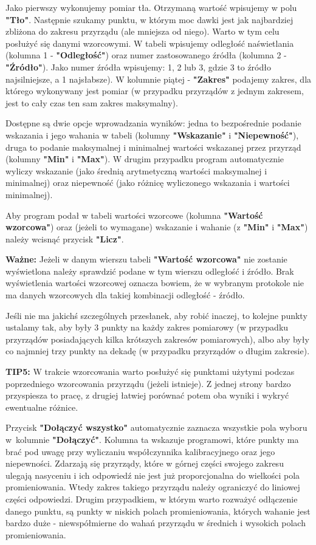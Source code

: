 Jako pierwszy wykonujemy pomiar tła. Otrzymaną wartość wpisujemy w polu \textbf{"Tło"}. Następnie szukamy punktu, w którym moc dawki jest jak najbardziej zbliżona do zakresu przyrządu (ale mniejsza od niego). Warto w tym celu posłużyć się danymi wzorcowymi. W tabeli wpisujemy odległość naświetlania (kolumna 1 - \textbf{"Odległość"}) oraz numer zastosowanego źródła (kolumna 2 - \textbf{"Źródło"}). Jako numer źródła wpisujemy: 1, 2 lub 3, gdzie 3 to źródło najsilniejsze, a 1 najsłabsze). W kolumnie piątej - \textbf{"Zakres"} podajemy zakres, dla którego wykonywany jest pomiar (w przypadku przyrządów z jednym zakresem, jest to cały czas ten sam zakres maksymalny).

Dostępne są dwie opcje wprowadzania wyników: jedna to bezpośrednie podanie wskazania i jego wahania w tabeli (kolumny \textbf{"Wskazanie"} i \textbf{"Niepewność"}), druga to podanie maksymalnej i minimalnej wartości wskazanej przez przyrząd (kolumny \textbf{"Min"} i \textbf{"Max"}). W drugim przypadku program automatycznie wyliczy wskazanie (jako średnią arytmetyczną wartości maksymalnej i minimalnej) oraz niepewność (jako różnicę wyliczonego wskazania i wartości minimalnej).

Aby program podał w tabeli wartości wzorcowe (kolumna \textbf{"Wartość wzorcowa"}) oraz (jeżeli to wymagane) wskazanie i wahanie (z \textbf{"Min"} i \textbf{"Max"}) należy wcisnąć przycisk \textbf{"Licz"}. 

\textbf{Ważne:} Jeżeli w danym wierszu tabeli \textbf{"Wartość wzorcowa"} nie zostanie wyświetlona należy sprawdzić podane w tym wierszu odległość i źródło. Brak wyświetlenia wartości wzorcowej oznacza bowiem, że w wybranym protokole nie ma danych wzorcowych dla takiej kombinacji odległość - źródło.

Jeśli nie ma jakichś szczególnych przesłanek, aby robić inaczej, to kolejne punkty ustalamy tak, aby były 3 punkty na każdy zakres pomiarowy (w przypadku przyrządów posiadających kilka krótszych zakresów pomiarowych), albo aby były co najmniej trzy punkty na dekadę (w przypadku przyrządów o długim zakresie).

\textbf{TIP5:} W trakcie wzorcowania warto posłużyć się punktami użytymi podczas poprzedniego wzorcowania przyrządu (jeżeli istnieje). Z jednej strony bardzo przyspiesza to pracę, z drugiej łatwiej porównać potem oba wyniki i wykryć ewentualne różnice.

Przycisk \textbf{"Dołączyć wszystko"} automatycznie zaznacza wszystkie pola wyboru w~kolumnie \textbf{"Dołączyć"}. Kolumna ta wskazuje programowi, które punkty ma brać pod uwagę przy wyliczaniu współczynnika kalibracyjnego oraz jego niepewności. Zdarzają się przyrządy, które w górnej części swojego zakresu ulegają nasyceniu i ich odpowiedź nie jest już proporcjonalna do wielkości pola promieniowania. Wtedy zakres takiego przyrządu należy ograniczyć do liniowej części odpowiedzi. Drugim przypadkiem, w którym warto rozważyć odłączenie danego punktu, są punkty w niskich polach promieniowania, których wahanie jest bardzo duże - niewspółmierne do wahań przyrządu w średnich i wysokich polach promieniowania.

